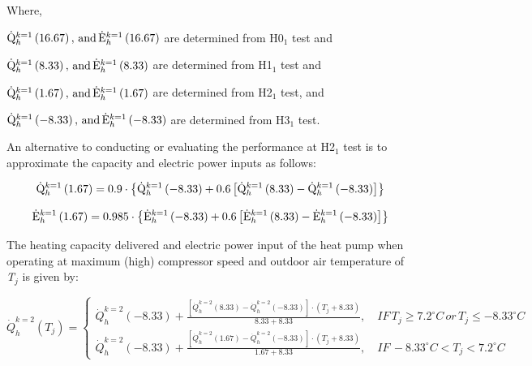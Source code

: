 Where,

\({\rm{\dot Q}}_h^{k = 1}\left( {{\rm{16}}{\rm{.67}}} \right),\,{\rm{and}}\,{\rm{\dot E}}_h^{k = 1}\left( {{\rm{16}}{\rm{.67}}} \right)\) are determined from H0\(_{1}\) test and

\({\rm{\dot Q}}_h^{k = 1}\left( {{\rm{8}}{\rm{.33}}} \right),\,{\rm{and}}\,{\rm{\dot E}}_h^{k = 1}\left( {{\rm{8}}{\rm{.33}}} \right)\) are determined from H1\(_{1}\) test and

\({\rm{\dot Q}}_h^{k = 1}\left( {{\rm{1}}{\rm{.67}}} \right),\,{\rm{and}}\,{\rm{\dot E}}_h^{k = 1}\left( {{\rm{1}}{\rm{.67}}} \right)\) are determined from H2\(_{1}\) test, and

\({\rm{\dot Q}}_h^{k = 1}\left( {{\rm{ - 8}}{\rm{.33}}} \right),\,{\rm{and}}\,{\rm{\dot E}}_h^{k = 1}\left( {{\rm{ - 8}}{\rm{.33}}} \right)\) are determined from H3\(_{1}\) test.

An alternative to conducting or evaluating the performance at H2\(_{1}\) test is to approximate the capacity and electric power inputs as follows:

\begin{equation}
{\rm{\dot Q}}_h^{k = 1}\left( {{\rm{1}}{\rm{.67}}} \right) = 0.9 \cdot \left\{ {{\rm{\dot Q}}_h^{k = 1}\left( {{\rm{ - 8}}{\rm{.33}}} \right) + 0.6\left[ {{\rm{\dot Q}}_h^{k = 1}\left( {{\rm{8}}{\rm{.33}}} \right) - {\rm{\dot Q}}_h^{k = 1}\left( {{\rm{ - 8}}{\rm{.33}}} \right)} \right]} \right\}
\end{equation}

\begin{equation}
{\rm{\dot E}}_h^{k = 1}\left( {{\rm{1}}{\rm{.67}}} \right) = 0.985 \cdot \left\{ {{\rm{\dot E}}_h^{k = 1}\left( {{\rm{ - 8}}{\rm{.33}}} \right) + 0.6\left[ {{\rm{\dot E}}_h^{k = 1}\left( {{\rm{8}}{\rm{.33}}} \right) - {\rm{\dot E}}_h^{k = 1}\left( {{\rm{ - 8}}{\rm{.33}}} \right)} \right]} \right\}
\end{equation}

The heating capacity delivered and electric power input of the heat pump when operating at maximum (high) compressor speed and outdoor air temperature of \emph{T\(_{j}\)} is given by:

\begin{equation}
\dot Q_h^{k = 2}({T_j}) = \left\{ \begin{array}{l}\dot Q_h^{k = 2}( - 8.33) + \frac{{\left[ {\dot Q_h^{k = 2}(8.33) - \dot Q_h^{k = 2}( - 8.33)} \right] \cdot \left( {{T_j} + 8.33} \right)}}{{8.33 + 8.33}},\quad IF\,{T_j} \ge 7.2^\circ C\,or\,{T_j} \le  - 8.33^\circ C\\\dot Q_h^{k = 2}( - 8.33) + \frac{{\left[ {\dot Q_h^{k = 2}(1.67) - \dot Q_h^{k = 2}( - 8.33)} \right] \cdot \left( {{T_j} + 8.33} \right)}}{{1.67 + 8.33}},\quad IF\, - 8.33^\circ C < {T_j} < 7.2^\circ C\end{array} \right.
\end{equation}

